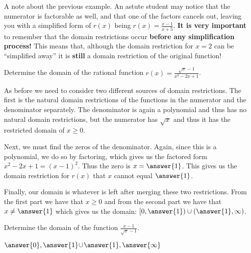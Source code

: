 \documentclass{ximera}
\begin{document}
A note about the previous example. An astute student may notice that the numerator is factorable as well, and that one of the factors cancels out, leaving you with a simplified form of $r(x)$ being $r(x) = \frac{x-1}{x+5}$. \textbf{It is very important} to remember that the domain restrictions occur \textbf{before any simplification process!} This means that, although the domain restriction for $x=2$ can be ``simplified away'' it is \textbf{still} a domain restriction of the original function!

\begin{example}
    Determine the domain of the rational function $r(x) = \frac{\sqrt{x} - 1}{x^2 - 2x + 1}$.
    
    As before we need to consider two different sources of domain restrictions. The first is the natural domain restrictions of the functions in the numerator and the denominator separately. The denominator is again a polynomial and thus has no natural domain restrictions, but the numerator has $\sqrt{x}$ and thus it has the restricted domain of $x \geq 0$.
    
    Next, we must find the zeros of the denominator. Again, since this is a polynomial, we do so by factoring, which gives us the factored form $x^2 - 2x + 1 = (x-1)^2$. Thus the zero is $x = \answer{1}$. This gives us the domain restriction for $r(x)$ that $x$ cannot equal $\answer{1}$.
    
    Finally, our domain is whatever is left after merging these two restrictions. From the first part we have that $x \geq 0$ and from the second part we have that $x \neq \answer{1}$ which gives us the domain: $[0,\answer{1}) \cup (\answer{1},\infty)$.
\end{example}

\begin{problem}
    Determine the domain of the function $\frac{x-1}{\sqrt{x} - 1}$.
    
    \wordChoice{\choice[correct]{$[$}\choice{$($}\choice{$)$}\choice{$]$}}$\answer{0},\answer{1}$\wordChoice{\choice{$[$}\choice{$($}\choice[correct]{$)$}\choice{$]$}}$\cup$\wordChoice{\choice{$[$}\choice[correct]{$($}\choice{$)$}\choice{$]$}}$\answer{1},\answer{\infty}$\wordChoice{\choice{$[$}\choice{$($}\choice[correct]{$)$}\choice{$]$}}
\end{problem}
\end{document}
